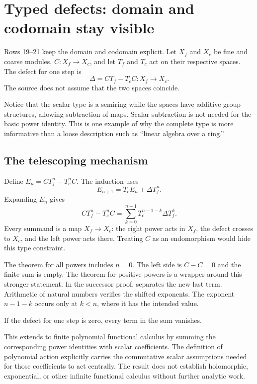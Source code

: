 \section{Typed defects: domain and codomain stay visible}\label{sec:defects}

Rows 19--21 keep the domain and codomain explicit. Let $X_f$ and $X_c$ be fine and coarse modules, $C:X_f\to X_c$, and let $T_f$ and $T_c$ act on their respective spaces. The defect for one step is
\[
\Delta=CT_f-T_cC:X_f\longrightarrow X_c.
\]
The source does not assume that the two spaces coincide.

Notice that the scalar type is a semiring while the spaces have additive group structures, allowing subtraction of maps. Scalar subtraction is not needed for the basic power identity. This is one example of why the complete type is more informative than a loose description such as ``linear algebra over a ring.''

\subsection{The telescoping mechanism}

Define $E_n=CT_f^n-T_c^nC$. The induction uses
\[
E_{n+1}=T_cE_n+\Delta T_f^n.
\]
Expanding $E_n$ gives
\[
CT_f^n-T_c^nC
=\sum_{k=0}^{n-1}T_c^{n-1-k}\Delta T_f^k.
\]
Every summand is a map $X_f\to X_c$: the right power acts in $X_f$, the defect crosses to $X_c$, and the left power acts there. Treating $C$ as an endomorphism would hide this type constraint.

The theorem for all powers includes $n=0$. The left side is $C-C=0$ and the finite sum is empty. The theorem for positive powers is a wrapper around this stronger statement. In the successor proof,  separates the new last term. Arithmetic of natural numbers verifies the shifted exponents. The exponent $n-1-k$ occurs only at $k<n$, where it has the intended value.

If the defect for one step is zero, every term in the sum vanishes.

This extends to finite polynomial functional calculus by summing the corresponding power identities with scalar coefficients. The definition of polynomial action explicitly carries the commutative scalar assumptions needed for those coefficients to act centrally. The result does not establish holomorphic, exponential, or other infinite functional calculus without further analytic work.

